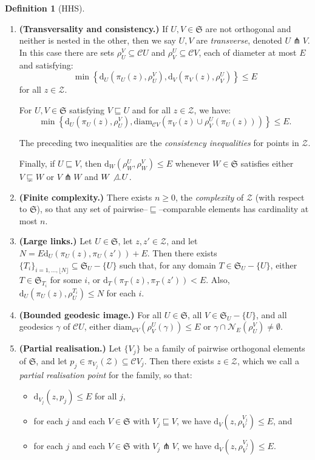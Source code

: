 \documentclass[svgnames]{amsart}
\theoremstyle{plain}
\theoremstyle{definition}
\newtheorem{defn}[thm]{Definition}
\newcommand{\frakS}{\mathfrak S}
\newcommand{\diam}{\mathrm{diam}}
\newcommand{\C}{\mathcal C}
\newcommand{\dist}{\mathrm{d}}
\newcommand{\nest}{\sqsubseteq}
\newcommand{\propnest}{\sqsubsetneq}
\newcommand{\transverse}{\pitchfork}
\newcommand{\neb}{\mathcal N}
\newcommand{\cuco}[1]{{\mathcal #1}}
\begin{document}
\begin{defn}[HHS]
\begin{enumerate}
\item \textbf{(Transversality and consistency.)}\label{item:dfs_transversal}
If $U,V\in\frakS$ are not orthogonal and neither is nested in the other, then we say $U,V$ are \emph{transverse}, denoted $U\transverse V$. In this case there are sets $\rho^V_U\subseteq\C U$ and $\rho^U_V\subseteq\C  V$, each of diameter at most $E$ and satisfying:
$$\min\left\{\dist_{U}(\pi_U(z),\rho^V_U),\dist_{V}(\pi_V(z),\rho^U_V)\right\}\leq E$$
for all $z\in  \cuco Z$.

For $U,V\in\frakS$ satisfying $V\nest U$ and for all $z\in \cuco Z$, we have: 
$$\min\left\{\dist_{U}(\pi_U(z),\rho^V_U),\diam_{\C V}(\pi_V(z)\cup\rho^U_V(\pi_U(z)))\right\}\leq E.$$ 
 
The preceding two inequalities are the \emph{consistency inequalities} for points in $ \cuco Z$.
 
Finally, if $U\nest V$, then $\dist_W(\rho^U_W,\rho^V_W)\leq E$ whenever $W\in\frakS$ satisfies either $V\propnest W$ or $V\transverse W$ and $W\not\bot U$.
 
\item \textbf{(Finite complexity.)} \label{item:dfs_complexity}
There exists $n\geq0$, the \emph{complexity} of $ \cuco Z$ (with respect to $\frakS$), so that any set of pairwise--$\nest$--comparable elements has cardinality at most $n$.
  
\item \textbf{(Large links.)} \label{item:dfs_large_link_lemma}
Let $U\in\frakS$, let $z,z'\in \cuco Z$, and let $N=E\dist_{U}(\pi_U(z),\pi_U(z'))+E$. Then there exists $\{T_i\}_{i=1,\dots,\lfloor N\rfloor}\subseteq\frakS_U- \{U\}$ such that, for any domain $T\in\mathfrak S_U-\{U\}$, either $T\in\frakS_{T_i}$ for some $i$, or $\dist_{T}(\pi_T(z),\pi_T(z'))<E$.  Also, $\dist_{U}(\pi_U(z),\rho^{T_i}_U)\leq N$ for each $i$.

\item \textbf{(Bounded geodesic image.)}\label{item:dfs:bounded_geodesic_image}
For all $U\in\frakS$, all $V\in\frakS_U- \{U\}$, and all geodesics $\gamma$ of $\C  U$, either $\diam_{\C  V}(\rho^U_V(\gamma))\leq E$ or $\gamma\cap\neb_E(\rho^V_U)\neq\emptyset$.
 
\item \textbf{(Partial realisation.)} \label{item:dfs_partial_realisation}
Let $\{V_j\}$ be a family of pairwise orthogonal elements of $\frakS$, and let $p_j\in \pi_{V_j}( \cuco Z)\subseteq \C  V_j$. Then there exists $z\in  \cuco Z$, which we call a \emph{partial realisation point} for the family, so that:
\begin{itemize}
\item $\dist_{V_j}(z,p_j)\leq E$ for all $j$,
\item for each $j$ and 
each $V\in\frakS$ with $V_j\nest V$, we have 
$\dist_{V}(z,\rho^{V_j}_V)\leq E$, and
\item for each $j$ and 
each $V\in\frakS$ with $V_j\transverse V$, we have $\dist_V(z,\rho^{V_j}_V)\leq E$.
\end{itemize}


\end{enumerate}
\end{defn}
\end{document}
